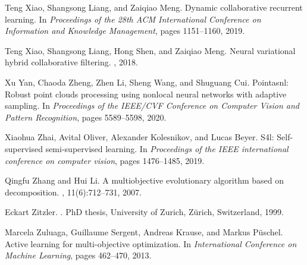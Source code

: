 \documentclass[final]{cvpr}
\begin{document}
\begin{thebibliography}{10}
	Teng Xiao, Shangsong Liang, and Zaiqiao Meng.
	\newblock Dynamic collaborative recurrent learning.
	\newblock In {\em Proceedings of the 28th ACM International Conference on
		Information and Knowledge Management}, pages 1151--1160, 2019.
	
	Teng Xiao, Shangsong Liang, Hong Shen, and Zaiqiao Meng.
	\newblock Neural variational hybrid collaborative filtering.
	, 2018.
	
	Xu Yan, Chaoda Zheng, Zhen Li, Sheng Wang, and Shuguang Cui.
	\newblock Pointasnl: Robust point clouds processing using nonlocal neural
	networks with adaptive sampling.
	\newblock In {\em Proceedings of the IEEE/CVF Conference on Computer Vision and
		Pattern Recognition}, pages 5589--5598, 2020.
	
	Xiaohua Zhai, Avital Oliver, Alexander Kolesnikov, and Lucas Beyer.
	\newblock S4l: Self-supervised semi-supervised learning.
	\newblock In {\em Proceedings of the IEEE international conference on computer
		vision}, pages 1476--1485, 2019.
	
	Qingfu Zhang and Hui Li.
	 {A} multiobjective evolutionary algorithm based on
	decomposition.
	, 11(6):712--731, 2007.
	
	Eckart Zitzler.
	.
	\newblock PhD thesis, University of Zurich, Z{\"{u}}rich, Switzerland, 1999.
	
	Marcela Zuluaga, Guillaume Sergent, Andreas Krause, and Markus P{\"u}schel.
	\newblock Active learning for multi-objective optimization.
	\newblock In {\em International Conference on Machine Learning}, pages
	462--470, 2013.
	
\end{thebibliography}
 
 
\end{document}
